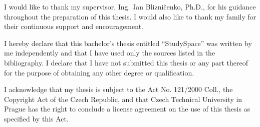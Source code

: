 \documentclass[english,bachelor,unicode,oneside]{ctufit-thesis}
\begin{document}
\frontmatter\frontmatterinit %

\thispagestyle{empty}\maketitle\thispagestyle{empty}\cleardoublepage %


\imprintpage %
\stopTOCentries

\begin{acknowledgmentpage}
	I would like to thank my supervisor, Ing. Jan Blizničenko, Ph.D., for his guidance throughout the preparation of this thesis. I would also like to thank my family for their continuous support and encouragement.
\end{acknowledgmentpage}


\begin{declarationpage}
	I hereby declare that this bachelor’s thesis entitled “StudySpace” was written by me independently and that I have used only the sources listed in the bibliography. I declare that I have not submitted this thesis or any part thereof for the purpose of obtaining any other degree or qualification.
	
	I acknowledge that my thesis is subject to the Act No. 121/2000 Coll., the Copyright Act of the Czech Republic, and that Czech Technical University in Prague has the right to conclude a license agreement on the use of this thesis
as specified by this Act.
\end{declarationpage}
\end{document}
